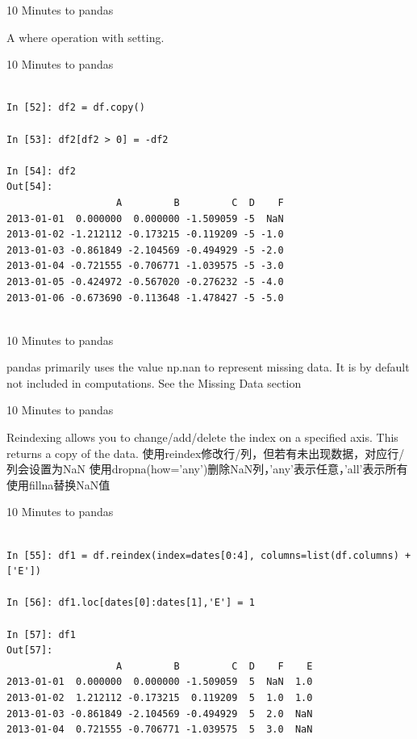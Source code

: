 \documentclass{beamer}
\begin{document}
\begin{frame}[t]{10 Minutes to pandas}

A where operation with setting.

\end{frame}


\begin{frame}[t,fragile]{10 Minutes to pandas}


	\scriptsize
\begin{verbatim}

In [52]: df2 = df.copy()

In [53]: df2[df2 > 0] = -df2

In [54]: df2
Out[54]: 
                   A         B         C  D    F
2013-01-01  0.000000  0.000000 -1.509059 -5  NaN
2013-01-02 -1.212112 -0.173215 -0.119209 -5 -1.0
2013-01-03 -0.861849 -2.104569 -0.494929 -5 -2.0
2013-01-04 -0.721555 -0.706771 -1.039575 -5 -3.0
2013-01-05 -0.424972 -0.567020 -0.276232 -5 -4.0
2013-01-06 -0.673690 -0.113648 -1.478427 -5 -5.0


\end{verbatim}


\end{frame}


\begin{frame}[t]{10 Minutes to pandas}

pandas primarily uses the value np.nan to represent missing data. It is by
default not included in computations. See the Missing Data section

\end{frame}


\begin{frame}[t]{10 Minutes to pandas}

Reindexing allows you to change/add/delete the index on a specified axis. This
returns a copy of the data.
使用reindex修改行/列，但若有未出现数据，对应行/列会设置为NaN
使用dropna(how='any')删除NaN列，'any'表示任意，'all'表示所有
使用fillna替换NaN值


\end{frame}


\begin{frame}[t,fragile]{10 Minutes to pandas}


	\scriptsize
\begin{verbatim}

In [55]: df1 = df.reindex(index=dates[0:4], columns=list(df.columns) + ['E'])

In [56]: df1.loc[dates[0]:dates[1],'E'] = 1

In [57]: df1
Out[57]: 
                   A         B         C  D    F    E
2013-01-01  0.000000  0.000000 -1.509059  5  NaN  1.0
2013-01-02  1.212112 -0.173215  0.119209  5  1.0  1.0
2013-01-03 -0.861849 -2.104569 -0.494929  5  2.0  NaN
2013-01-04  0.721555 -0.706771 -1.039575  5  3.0  NaN


\end{verbatim}


\end{frame}
\end{document}
